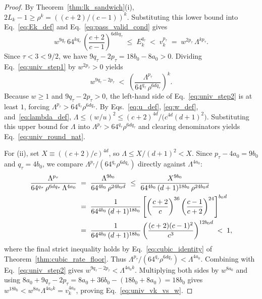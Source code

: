 \documentclass[11pt,a4paper]{article}
\theoremstyle{plain}
\theoremstyle{definition}
\theoremstyle{remark}
\begin{document}
\begin{proof}
By Theorem~\ref{thm:lk_sandwich}(i), $2 L_k - 1 \ge \rho^k = ((c + 2)/(c - 1))^k$. Substituting this lower bound into Eq.~\eqref{eq:Ek_def} and Eq.~\eqref{eq:pass_valid_cond} gives
\begin{equation}
    w^{9 q_\tau}\,64^{k q_\tau}\,\left(\frac{c + 2}{c - 1}\right)^{6 d k q_\tau} \;\le\; E_k^{q_\tau} \;<\; v_k^{p_\tau} \;=\; w^{2 p_\tau}\,\Lambda^{k p_\tau} .
    \label{eq:univ_step1}
\end{equation}
Since $\tau < 3 < 9/2$, we have $9 q_\tau - 2 p_\tau = 18 b_0 - 8 a_0 > 0$. Dividing Eq.~\eqref{eq:univ_step1} by $w^{2 p_\tau} > 0$ yields
\begin{equation}
    w^{9 q_\tau - 2 p_\tau} \;<\; \left(\frac{\Lambda^{p_\tau}}{64^{q_\tau}\,\rho^{6 d q_\tau}}\right)^k .
    \label{eq:univ_step2}
\end{equation}
Because $w \ge 1$ and $9 q_\tau - 2 p_\tau > 0$, the left-hand side of Eq.~\eqref{eq:univ_step2} is at least $1$, forcing $\Lambda^{p_\tau} > 64^{q_\tau} \rho^{6 d q_\tau}$. By Eqs.~\eqref{eq:u_def}, \eqref{eq:w_def}, and~\eqref{eq:lambda_def}, $\Lambda \le (w/u)^2 \le (c + 2)^{4d} / \bigl(c^{4d}(d + 1)^2\bigr)$. Substituting this upper bound for $\Lambda$ into $\Lambda^{p_\tau} > 64^{q_\tau} \rho^{6 d q_\tau}$ and clearing denominators yields Eq.~\eqref{eq:univ_round_nat}.

For (ii), set $X \equiv ((c + 2)/c)^{4d}$, so $\Lambda \le X/(d + 1)^2 < X$. Since $p_\tau - 4 a_0 = 9 b_0$ and $q_\tau = 4 b_0$, we compare $\Lambda^{p_\tau} / (64^{q_\tau} \rho^{6 d q_\tau})$ directly against $\Lambda^{4 a_0}$:
\begin{align}
    \frac{\Lambda^{p_\tau}}{64^{q_\tau}\,\rho^{6 d q_\tau}\,\Lambda^{4 a_0}}
    &\;=\; \frac{\Lambda^{9 b_0}}{64^{4 b_0}\,\rho^{24 b_0 d}}
    \;\le\; \frac{X^{9 b_0}}{64^{4 b_0}\,(d + 1)^{18 b_0}\,\rho^{24 b_0 d}} \notag\\
    &\;=\; \frac{1}{64^{4 b_0}\,(d + 1)^{18 b_0}} \left[\left(\frac{c + 2}{c}\right)^{36}\left(\frac{c - 1}{c + 2}\right)^{24}\right]^{b_0 d} \notag\\
    &\;=\; \frac{1}{64^{4 b_0}\,(d + 1)^{18 b_0}} \left(\frac{(c + 2)(c - 1)^2}{c^3}\right)^{12 b_0 d} \;<\; 1 ,
    \label{eq:univ_cancel}
\end{align}
where the final strict inequality holds by Eq.~\eqref{eq:cubic_identity} of Theorem~\ref{thm:cubic_rate_floor}. Thus $\Lambda^{p_\tau} / (64^{q_\tau} \rho^{6 d q_\tau}) < \Lambda^{4 a_0}$. Combining with Eq.~\eqref{eq:univ_step2} gives $w^{9 q_\tau - 2 p_\tau} < \Lambda^{4 a_0 k}$. Multiplying both sides by $w^{8 a_0}$ and using $8 a_0 + 9 q_\tau - 2 p_\tau = 8 a_0 + 36 b_0 - (18 b_0 + 8 a_0) = 18 b_0$ gives $w^{18 b_0} < w^{8 a_0} \Lambda^{4 a_0 k} = v_k^{4 a_0}$, proving Eq.~\eqref{eq:univ_vk_vs_w}.


\end{proof}
\end{document}
